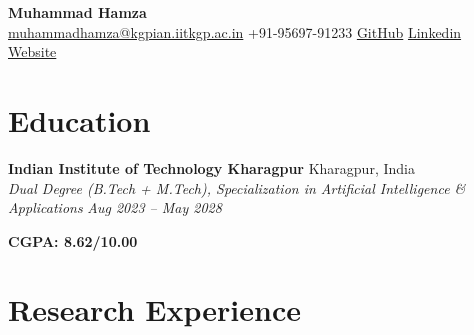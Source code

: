 \documentclass[10.5pt, a4paper]{article}
\newcommand{\expEntry}[4]{%
    \hspace*{-16pt}%
    \textbf{#1} \hfill #2 \\
    \hspace*{-12pt}%
    \textit{#3} \hfill \textit{#4} \\[-4pt]
    \vspace{-6pt}
}
\begin{document}
\pagestyle{empty}

\begin{center}
    {\LARGE\bfseries\color{msblue} Muhammad Hamza}\\[4pt]
     \href{mailto:muhammadhamza@kgpian.iitkgp.ac.in}{muhammadhamza@kgpian.iitkgp.ac.in} \quad
     +91-95697-91233 \quad
     \href{https://github.com/hamza-faarooq}{GitHub} \quad
     \href{https://www.linkedin.com/in/muhammad-hamza-iftekhar-hamid-784903204/}{Linkedin} \quad
     \href{https://hamza-faarooq.github.io}{Website}
\end{center}
\vspace{6pt}

\section{Education}
\expEntry
    {Indian Institute of Technology Kharagpur}{Kharagpur, India}
    {Dual Degree (B.Tech + M.Tech), Specialization in Artificial Intelligence \& Applications}{Aug 2023 -- May 2028}

\vspace{-6pt}
\hspace{-1pt}\textbf{CGPA: 8.62/10.00}
    \vspace{-2pt}

\section{Research Experience}
    \vspace{1pt}
\end{document}

